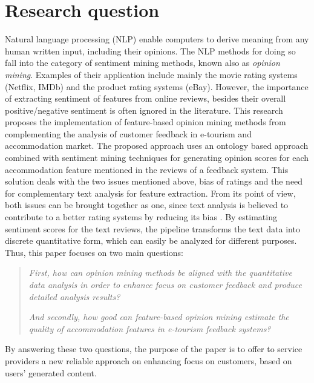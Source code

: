 \section{Research question}
Natural language processing (NLP) enable computers to derive meaning from any human written input, including their opinions. The NLP methods for doing so fall into the category of sentiment mining methods, known also as \textit{opinion mining}. Examples of their application include mainly the movie rating systems (Netflix, IMDb) and the product rating systems (eBay). However, the importance of extracting sentiment of features from online reviews, besides their overall positive/negative sentiment is often ignored in the literature. This research proposes the implementation of feature-based opinion mining methods from complementing the analysis of customer feedback in e-tourism and accommodation market. The proposed approach uses an ontology based approach combined with sentiment mining techniques for generating opinion scores for each accommodation feature mentioned in the reviews of a feedback system. This solution deals with the two issues mentioned above, bias of ratings and the need for complementary text analysis for feature extraction. From its point of view, both issues can be brought together as one, since text analysis is believed to contribute to a better rating systems by reducing its bias \cite{fradkin2016bias}. By estimating sentiment scores for the text reviews, the pipeline transforms the text data into discrete quantitative form, which can easily be analyzed for different purposes. Thus, this paper focuses on two main questions:
\begin{quote} \textit{First, how can opinion mining methods be aligned with the quantitative data analysis in order to enhance focus on customer feedback and produce detailed analysis results?}

 \textit{And secondly, how good can feature-based opinion mining estimate the quality of accommodation features in e-tourism feedback systems?}
\end{quote}
By answering these two questions, the purpose of the paper is to offer to service providers a new reliable approach on enhancing focus on customers, based on users' generated content.


